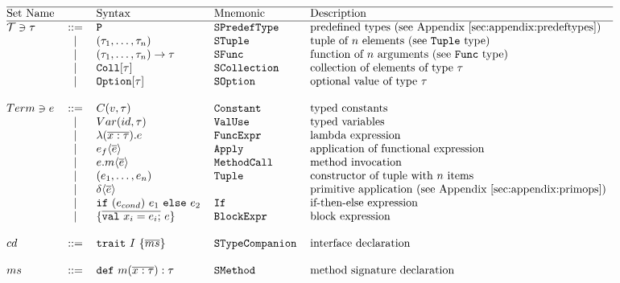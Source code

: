 \[\begin{tabular}{@{}l c l l l} 
\hline
Set Name				&  			& Syntax	& Mnemonic 		& Description \\
\hline
$\mathcal{T} \ni \tau$	& ::= 		& \lst{P} 	& \lst{SPredefType}	& predefined types (see Appendix~\ref{sec:appendix:predeftypes}) \\

			&	$\mid$	& $(\tau_1, \dots ,\tau_n) $	& \lst{STuple} & tuple of $n$ elements (see \lst{Tuple} type)\\

			&   $\mid$  & $(\tau_1,\dots,\tau_n) \to \tau $	& \lst{SFunc} & function of $n$ arguments (see \lst{Func} type) \\
			&   $\mid$  & $\text{\lst{Coll}}[\tau]$			& \lst{SCollection} & collection of elements of type $\tau$   \\
			&   $\mid$  & $\text{\lst{Option}}[\tau]$		& \lst{SOption} & optional value of type $\tau$  \\
			& 	     	&									& 				&		\\

$Term\ni e$	& ::= 		&   $C(v, \tau) $				& \lst{Constant} & typed constants  \\
			& 	$\mid$ 	& 	$Var(id, \tau) $ 			& \lst{ValUse} & typed variables  \\
			& 	$\mid$ 	& 	$\TyLam{x}{\tau}{e}$ 		& \lst{FuncExpr} & lambda expression \\
			& 	$\mid$ 	& 	$\Apply{e_f}{\Ov{e}}$ 		& \lst{Apply} & application of functional expression \\
			& 	$\mid$ 	& 	$\Apply{e.m}{\Ov{e}}$		& \lst{MethodCall} & method invocation  \\
			& 	$\mid$ 	&   $\Tup{e_1, \dots ,e_n}$ 	& \lst{Tuple} & constructor of tuple with $n$ items \\
			& 	$\mid$ 	& 	$\Apply{\delta}{\Ov{e}}$ 	& & primitive application (see Appendix~\ref{sec:appendix:primops}) \\
			& 	$\mid$ 	& 	\lst{if} $(e_{cond})$ $e_1$ \lst{else} $e_2$ & \lst{If} & if-then-else expression \\
			& 	$\mid$ 	&   $\{ \Ov{\text{\lst{val}}~x_i = e_i;}~e\}$  & \lst{BlockExpr} & block expression \\
			& 	     	&										& &				\\
$cd$   		& ::= 		& 	$\Trait{I}{\Ov{ms}}$				& \lst{STypeCompanion} & interface declaration    \\
			& 	     	&										& &				\\
$ms$	   	& ::= 	& $\MSig{m}{\overline{x : \tau}}{\tau}$ 	& \lst{SMethod} & method signature declaration   \\
\end{tabular}\] 

